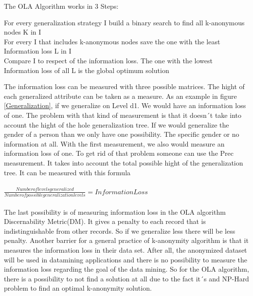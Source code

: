 \documentclass{llncs}
\begin{document}
\begin{algorithm}[H]
\caption{The OLA Algorithm works in 3 Steps:}
{
For every generalization strategy I build a binary search to find all k-anonymous nodes K in I\\
For every I that includes k-anonymous nodes save the one with the least Information loss L in I\\
Compare I to respect of the information loss. The one with the lowest Information loss of all L is the global optimum solution\\
}
\end{algorithm}

The information loss can be measured with three possible matrices. The hight of each generalized attribute can be taken as a measure. As an example in figure \ref{Generalization}, if we generalize on Level d1. We would have an information loss of one. The problem with that kind of measurement is that it doesn´t take into account the hight of the hole generalization tree. If we would generalize the gender of a person than we only have one possibility. The specific gender or no information at all. With the first measurement, we also would measure an information loss of one. To get rid of that problem someone can use the Prec measurement. It takes into account the total possible hight of the generalization tree. It can be measured with this formula\\\\ $\frac{Number of levels generalized}{Number of possible generalization levels} = Information Loss$\\\\The last possibility is of measuring information loss in the OLA algorithm Discernability Metric(DM). It gives a penalty to each record that is indistinguishable from other records. So if we generalize less there will be less penalty. Another barrier for a general practice of k-anonymity algorithm is that it measures the information loss in their data set. After all, the anonymized dataset will be used in datamining applications and there is no possibility to measure the information loss regarding the goal of the data mining. So for the OLA algorithm, there is a possibility to not find a solution at all due to the fact it´s and NP-Hard problem to find an optimal k-anonymity solution\cite{el2009globally}.
\end{document}
